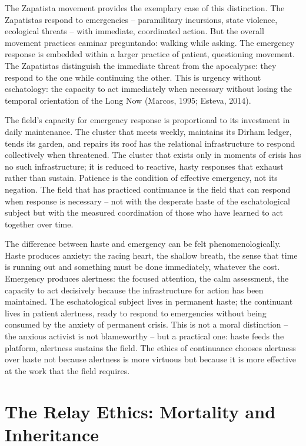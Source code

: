 The Zapatista movement provides the exemplary case of this distinction. The Zapatistas respond to emergencies -- paramilitary incursions, state violence, ecological threats -- with immediate, coordinated action. But the overall movement practices caminar preguntando: walking while asking. The emergency response is embedded within a larger practice of patient, questioning movement. The Zapatistas distinguish the immediate threat from the apocalypse: they respond to the one while continuing the other. This is urgency without eschatology: the capacity to act immediately when necessary without losing the temporal orientation of the Long Now (Marcos, 1995; Esteva, 2014).

The field's capacity for emergency response is proportional to its investment in daily maintenance. The cluster that meets weekly, maintains its Dirham ledger, tends its garden, and repairs its roof has the relational infrastructure to respond collectively when threatened. The cluster that exists only in moments of crisis has no such infrastructure; it is reduced to reactive, hasty responses that exhaust rather than sustain. Patience is the condition of effective emergency, not its negation. The field that has practiced continuance is the field that can respond when response is necessary -- not with the desperate haste of the eschatological subject but with the measured coordination of those who have learned to act together over time.

The difference between haste and emergency can be felt phenomenologically. Haste produces anxiety: the racing heart, the shallow breath, the sense that time is running out and something must be done immediately, whatever the cost. Emergency produces alertness: the focused attention, the calm assessment, the capacity to act decisively because the infrastructure for action has been maintained. The eschatological subject lives in permanent haste; the continuant lives in patient alertness, ready to respond to emergencies without being consumed by the anxiety of permanent crisis. This is not a moral distinction -- the anxious activist is not blameworthy -- but a practical one: haste feeds the platform, alertness sustains the field. The ethics of continuance chooses alertness over haste not because alertness is more virtuous but because it is more effective at the work that the field requires.

\section{The Relay Ethics: Mortality and Inheritance}

